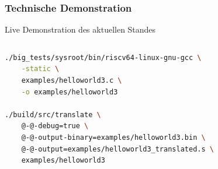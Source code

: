 
\begin{frame}[fragile]
    \frametitle{Technische Demonstration}{Live Demonstration des aktuellen Standes}


    \begin{columns}[c]
        \begin{lstlisting}[language=bash, basicstyle=\small\ttfamily, extendedchars=true,escapeinside={@@}]
./big_tests/sysroot/bin/riscv64-linux-gnu-gcc \
    -static \
    examples/helloworld3.c \
    -o examples/helloworld3

./build/src/translate \
    @-@-debug=true \
    @-@-output-binary=examples/helloworld3.bin \
    @-@-output=examples/helloworld3_translated.s \
    examples/helloworld3
    \end{lstlisting}


\end{columns}
\end{frame}
